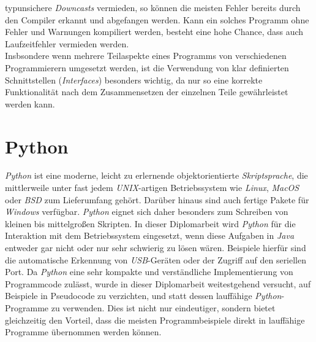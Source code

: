         typunsichere \emph{Downcasts} vermieden, so können die meisten Fehler bereits durch den Compiler erkannt und 
        abgefangen werden. Kann ein solches Programm ohne Fehler und Warnungen kompiliert werden, besteht eine hohe Chance,
        dass auch Laufzeitfehler vermieden werden.\\
        Insbsondere wenn mehrere Teilaspekte eines Programms von verschiedenen Programmierern umgesetzt werden, 
        ist die Verwendung von klar definierten Schnittstellen (\emph{Interfaces}) besonders wichtig, da nur so eine korrekte
        Funktionalität nach dem Zusammensetzen der einzelnen Teile gewährleistet werden kann.

\section{Python}
    \emph{Python} ist eine moderne, leicht zu erlernende objektorientierte \emph{Skriptsprache}, die mittlerweile 
    unter fast jedem \emph{UNIX}-artigen Betriebssystem wie \emph{Linux}, \emph{MacOS} oder \emph{BSD} zum Lieferumfang 
    gehört. Darüber hinaus sind auch fertige Pakete für \emph{Windows} verfügbar. \emph{Python} eignet sich daher 
    besonders zum Schreiben von kleinen
    bis mittelgroßen Skripten. In dieser Diplomarbeit wird \emph{Python} für die Interaktion mit dem Betriebssystem
    eingesetzt, wenn diese Aufgaben in \emph{Java} entweder gar nicht oder nur sehr schwierig zu lösen wären. Beispiele
    hierfür sind die automatische Erkennung von \emph{USB}-Geräten oder der Zugriff auf den seriellen Port.
    Da \emph{Python} eine sehr kompakte und verständliche Implementierung von Programmcode zulässt, wurde in dieser
    Diplomarbeit weitestgehend versucht, auf Beispiele in Pseudocode zu verzichten, und statt dessen lauffähige
    \emph{Python}-Programme zu verwenden. Dies ist nicht nur eindeutiger, sondern bietet gleichzeitig den Vorteil,
    dass die meisten Programmbeispiele direkt in lauffähige Programme übernommen werden können.

